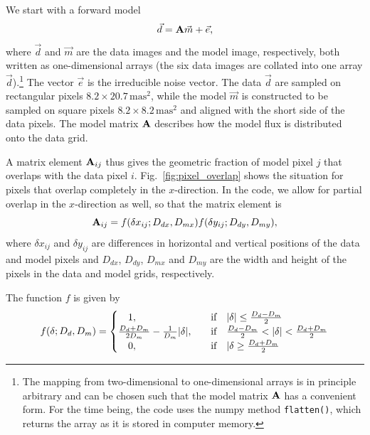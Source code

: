 We start with a forward model
\begin{equation}
  \label{eq:forward_model}
  \vec{d} = \mathbf{A}\vec{m} + \vec{e},
\end{equation}
where $\vec{d}$ and $\vec{m}$ are the data images and the model image, respectively,
both written as one-dimensional arrays (the six data images are collated into one array
$\vec{d}$).\footnote{The mapping from two-dimensional to one-dimensional arrays is in
principle arbitrary and can be chosen such that the model matrix $\mathbf{A}$ has a convenient form.
For the time being, the code uses the numpy method \lstinline{flatten()},
which returns the array as it is stored in computer memory.}
The vector $\vec{e}$ is the irreducible noise vector.
The data $\vec{d}$ are sampled on rectangular pixels $8.2 \times 20.7\,\mathrm{mas^{2}}$,
while the model $\vec{m}$ is constructed to be sampled on square pixels $8.2 \times 8.2\,\mathrm{mas^{2}}$
and aligned with the short side of the data pixels.
The model matrix $\mathbf{A}$ describes how the model flux is distributed onto the data grid.

A matrix element $\mathbf{A}_{ij}$ thus gives the geometric fraction of model pixel $j$ that overlaps with the data pixel $i$.
Fig.~\ref{fig:pixel_overlap} shows the situation for pixels that overlap completely in the $x$-direction.
In the code, we allow for partial overlap in the $x$-direction as well, so that the matrix element is
\begin{equation}
    \mathbf{A}_{ij} = f(\delta x_{ij}; D_{dx}, D_{mx}) f(\delta y_{ij}; D_{dy}, D_{my}),
    \label{eq:model_matrix_element}
\end{equation}
where $\delta x_{ij}$ and $\delta y_{ij}$ are differences in horizontal and vertical positions
of the data and model pixels and $D_{dx}$, $D_{dy}$, $D_{mx}$ and $D_{my}$ are the width and height
of the pixels in the data and model grids, respectively.

The function $f$ is given by
\begin{equation}
    \label{eq:overlap}
    f(\delta; D_{d}, D_{m}) =
        \begin{cases}
            \quad 1,
                & \text{if}\quad\lvert\delta\rvert \leq \frac{D_{d} - D_{m}}{2} \\
            \frac{D_{d} + D_{m}}{2D_{m}} - \frac{1}{D_{m}}\lvert\delta\rvert,\quad
                & \text{if}\quad\frac{D_{d} - D_{m}}{2} < \lvert\delta\rvert < \frac{D_{d} + D_{m}}{2} \\
            \quad 0,
                & \text{if}\quad\lvert{\delta} \geq \frac{D_{d} + D_{m}}{2}
        \end{cases}
\end{equation}

